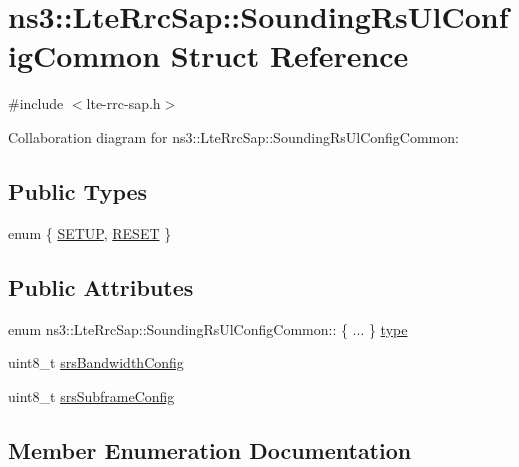 \hypertarget{structns3_1_1LteRrcSap_1_1SoundingRsUlConfigCommon}{}\section{ns3\+:\+:Lte\+Rrc\+Sap\+:\+:Sounding\+Rs\+Ul\+Config\+Common Struct Reference}
\label{structns3_1_1LteRrcSap_1_1SoundingRsUlConfigCommon}


{\ttfamily \#include $<$lte-\/rrc-\/sap.\+h$>$}



Collaboration diagram for ns3\+:\+:Lte\+Rrc\+Sap\+:\+:Sounding\+Rs\+Ul\+Config\+Common\+:
\subsection*{Public Types}
\begin{DoxyCompactItemize}
\item 
enum \{ \hyperlink{structns3_1_1LteRrcSap_1_1SoundingRsUlConfigCommon_a62ba41811b9890980bd99ed7d0367545abc70b649f0e178d8bd308af0a12d3c76}{S\+E\+T\+UP}, 
\hyperlink{structns3_1_1LteRrcSap_1_1SoundingRsUlConfigCommon_a62ba41811b9890980bd99ed7d0367545a8597a1248ecbf7b56dcb00237b98545a}{R\+E\+S\+ET}
 \}
\end{DoxyCompactItemize}
\subsection*{Public Attributes}
\begin{DoxyCompactItemize}
\item 
enum ns3\+::\+Lte\+Rrc\+Sap\+::\+Sounding\+Rs\+Ul\+Config\+Common\+:: \{ ... \}  \hyperlink{structns3_1_1LteRrcSap_1_1SoundingRsUlConfigCommon_adc03f36bfe4d4e6164f3be8776203dea}{type}
\item 
uint8\+\_\+t \hyperlink{structns3_1_1LteRrcSap_1_1SoundingRsUlConfigCommon_a075f57098da17d321d2ac57a1f21fd7e}{srs\+Bandwidth\+Config}
\item 
uint8\+\_\+t \hyperlink{structns3_1_1LteRrcSap_1_1SoundingRsUlConfigCommon_a37f0e375bfa9d07583afa6b7d88223ab}{srs\+Subframe\+Config}
\end{DoxyCompactItemize}


\subsection{Member Enumeration Documentation}
